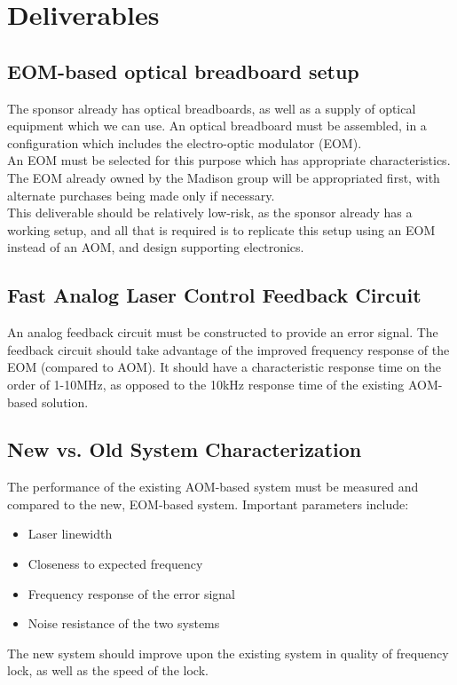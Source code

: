 \newpage
\section{Deliverables}

\subsection{EOM-based optical breadboard setup}

The sponsor already has optical breadboards, as well as a supply of optical equipment
which we can use.  An optical breadboard must be assembled, in a configuration which
includes the electro-optic modulator (EOM). \\

An EOM must be selected for this purpose which has appropriate characteristics. The
EOM already owned by the Madison group will be appropriated first, with alternate
purchases being made only if necessary. \\

This deliverable should be relatively low-risk, as the sponsor already has a working
setup, and all that is required is to replicate this setup using an EOM instead of an AOM,
and design supporting electronics.

\subsection{Fast Analog Laser Control Feedback Circuit}

An analog feedback circuit must be constructed to provide an error signal.  The feedback circuit should take advantage of the improved frequency response of the EOM (compared to AOM).  It should have a characteristic response time on the order of 1-10MHz, as opposed to the 10kHz response time of the existing AOM-based solution.

\subsection{New vs. Old System Characterization}

The performance of the existing AOM-based system must be measured and compared to the new,
EOM-based system.  Important parameters include:

\begin{itemize}
    \item Laser linewidth
    \item Closeness to expected frequency
    \item Frequency response of the error signal
    \item Noise resistance of the two systems
\end{itemize}

The new system should improve upon the existing system in quality of frequency lock, as well as the speed of the lock.